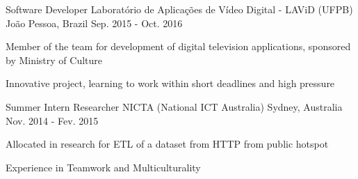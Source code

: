\begin{cventries}

\cventry
    {Software Developer} %
    {Laboratório  de Aplicações de Vídeo Digital - LAViD (UFPB)} %
    {João Pessoa, Brazil} %
    {Sep. 2015 - Oct. 2016} %
    {
      \begin{cvitems} %
        \item {Member of the team for development of digital television applications, sponsored by Ministry of Culture}
        \item {Innovative project, learning to work within short deadlines and high pressure}
      \end{cvitems}
    }
%

  \cventry
    {Summer Intern Researcher} %
    {NICTA (National ICT Australia)} %
    {Sydney, Australia} %
    {Nov. 2014 - Fev. 2015} %
    {
      \begin{cvitems} %
        \item {Allocated in research for ETL of a dataset from HTTP from public hotspot}
        \item {Experience in Teamwork and Multiculturality}
      \end{cvitems}
    }


\end{cventries}
